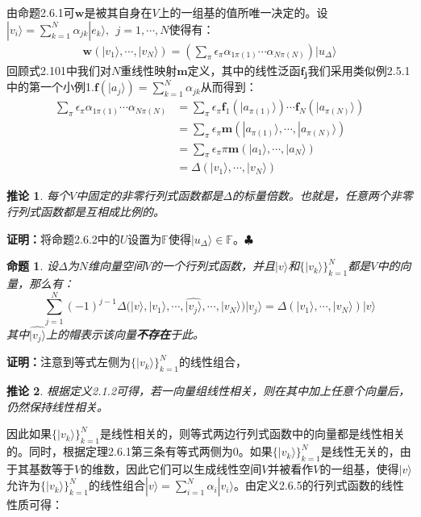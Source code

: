 \documentclass[mathserif,hyperref,UTF8,openany,b5paper]{ctexbook}
\newtheorem{pro}{命题}[section]
\newtheorem{cor}{推论}[section]
\begin{document}
由命题2.6.1可$\mathbf{w}$是被其自身在$V$上的一组基的值所唯一决定的。设$|v_i\rangle = \sum^N_{k=1}\alpha_{jk}|e_k\rangle,\ \ j=1,\cdots,N$使得有：
\begin{align}
\mathbf{w}(|v_1\rangle,\cdots,|v_N\rangle)=\left( \sum_\pi \epsilon_\pi\alpha_{1\pi(1)}\cdots\alpha_{N\pi(N)}\right)|u_\Delta\rangle
\end{align}
回顾式2.101中我们对$N$重线性映射$\mathbf{m}$定义，其中的线性泛函$\mathbf{f_j}$我们采用类似例2.5.1中的第一个小例1.$\mathbf{f}(|a_j\rangle)=\sum^N_{k=1}\alpha_{jk}$从而得到：
\begin{align}
    \sum_\pi \epsilon_\pi\alpha_{1\pi(1)}\cdots\alpha_{N\pi(N)}&=\sum_\pi \epsilon_\pi\mathbf{f}_1(|a_{\pi(1)}\rangle)\cdots \mathbf{f}_N(|a_{\pi(N)}\rangle)\\
    &=\sum_\pi \epsilon_\pi\mathbf{m}(|a_{\pi(1)}\rangle,\cdots ,|a_{\pi(N)}\rangle)\\
    &=\sum_\pi \epsilon_\pi \pi\mathbf{m}(|a_{1}\rangle,\cdots ,|a_{N}\rangle)\\
    &=\Delta(|v_1\rangle,\cdots,|v_N\rangle)
\end{align}
\begin{cor}
每个$V$中固定的非零行列式函数都是$\Delta$的标量倍数。也就是，任意两个非零行列式函数都是互相成比例的。
\end{cor}
\textbf{证明：}将命题2.6.2中的$U$设置为$\mathbb{F}$使得$|u_\Delta\rangle\in \mathbb{F}$。$\clubsuit$
\begin{pro}
设$\Delta$为$N$维向量空间$V$的一个行列式函数，并且$|v\rangle$和$\{|v_k\rangle\}^N_{k=1}$都是$V$中的向量，那么有：
\begin{equation}
    \sum_{j=1}^N(-1)^{j-1}\Delta(|v\rangle,|v_1\rangle,\cdots,\widehat{|v_j\rangle},\cdots,|v_N\rangle)|v_j\rangle=\Delta(|v_1\rangle,\cdots,|v_N\rangle)|v\rangle
\end{equation}
其中$\widehat{|v_j\rangle}$上的帽表示该向量\textbf{不存在}于此。
\end{pro}
\textbf{证明：}注意到等式左侧为$\{|v_k\rangle\}^N_{k=1}$的线性组合，\begin{cor}
根据定义2.1.2可得，若一向量组线性相关，则在其中加上任意个向量后，仍然保持线性相关。
\end{cor} 因此如果$\{|v_k\rangle\}^N_{k=1}$是线性相关的，则等式两边行列式函数中的向量都是线性相关的。同时，根据定理2.6.1第三条有等式两侧为$0$。如果$\{|v_k\rangle\}^N_{k=1}$是线性无关的，由于其基数等于$V$的维数，因此它们可以生成线性空间$V$并被看作$V$的一组基，使得$|v\rangle$允许为$\{|v_k\rangle\}^N_{k=1}$的线性组合$|v\rangle=\sum_{i=1}^N\alpha_i|v_i\rangle$。由定义2.6.5的行列式函数的线性性质可得：
\end{document}
